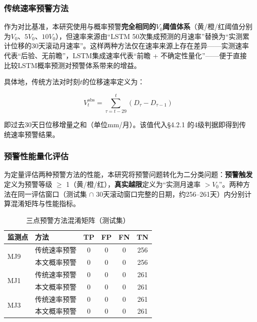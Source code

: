 \documentclass[12pt,a4paper]{article}
\newcommand{\tabcaption}[2]{%
  \caption[#1]{{\CJKfamily{songbold}#1}}}
\begin{document}
\subsubsection{传统速率预警方法}

作为对比基准，本研究使用与概率预警\textbf{完全相同的$V_0$阈值体系}（黄/橙/红阈值分别为$V_0$、$5V_0$、$10V_0$），但速率来源由“LSTM 50次集成预测的月速率”替换为“实测累计位移的30天滚动月速率”。这样两种方法仅在速率来源上存在差异——实测速率代表“后验、无前瞻”，LSTM集成速率代表“前瞻 + 不确定性量化”——便于直接比较LSTM概率预测对预警体系带来的增益。

具体地，传统方法对时刻$t$的位移速率定义为：

\begin{equation}
V_t^{\text{obs}} = \sum_{\tau=t-29}^{t}(D_\tau - D_{\tau-1})
\end{equation}

即过去30天日位移增量之和（单位mm/月）。该值代入\S4.2.1 的4级判据即得到传统速率预警结果。

\subsubsection{预警性能量化评估}

为定量评估两种预警方法的性能，本研究将预警问题转化为二分类问题：\textbf{预警触发}定义为预警等级 $\geq$ 1（黄/橙/红），\textbf{真实越限}定义为“实测月速率 $> V_0$”。两种方法在同一评估窗口（测试集 $\cap$ 30天滚动窗口完整的日期，约256--261天）内分别计算混淆矩阵与性能指标。

\begin{table}[htbp]
\centering
\tabcaption{三点预警方法混淆矩阵（测试集）}{Confusion Matrices at Three Monitoring Points (Test Set)}
\label{tab:confusion_matrix}
\begin{tabular}{llcccc}
\toprule
监测点 & 方法 & TP & FP & FN & TN \\
\midrule
\multirow{2}{*}{MJ9} & 传统速率预警 & 0 & 0 & 0 & 256 \\
                    & 本文概率预警 & 0 & 0 & 0 & 256 \\
\midrule
\multirow{2}{*}{MJ1} & 传统速率预警 & 0 & 0 & 0 & 261 \\
                    & 本文概率预警 & 0 & 0 & 0 & 261 \\
\midrule
\multirow{2}{*}{MJ3} & 传统速率预警 & 0 & 0 & 0 & 261 \\
                    & 本文概率预警 & 0 & 0 & 0 & 261 \\
\bottomrule
\end{tabular}
\end{table}
\end{document}
